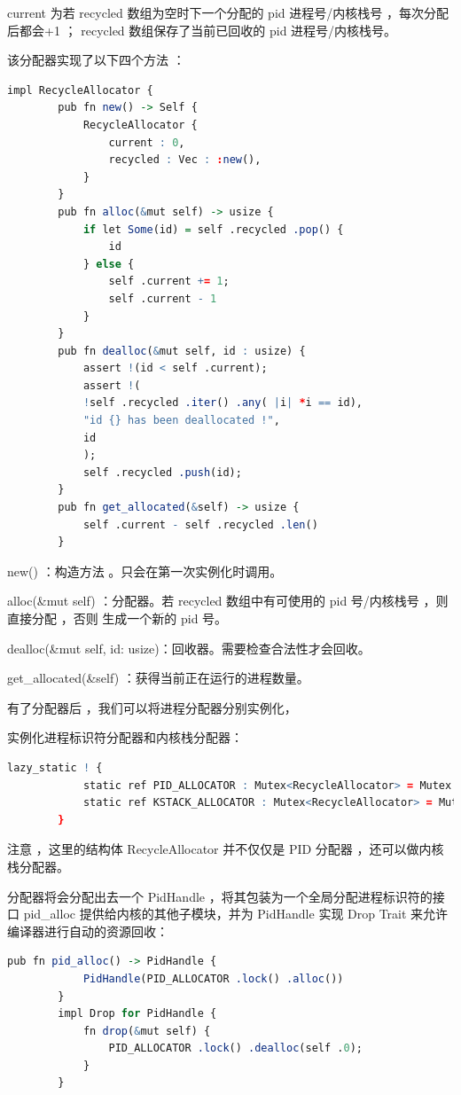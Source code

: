 current 为若 recycled 数组为空时下⼀个分配的 pid 进程号/内核栈号 ，每次分配后都会+1 ； recycled 数组保存了当前已回收的 pid 进程号/内核栈号。

该分配器实现了以下四个方法 ：

\begin{lstlisting}[language=R]
	impl RecycleAllocator {
		pub fn new() -> Self {
			RecycleAllocator {
				current : 0,
				recycled : Vec : :new(),
			}
		}
		pub fn alloc(&mut self) -> usize {
			if let Some(id) = self .recycled .pop() {
				id
			} else {
				self .current += 1;
				self .current - 1
			}
		}
		pub fn dealloc(&mut self, id : usize) {
			assert !(id < self .current);
			assert !(
			!self .recycled .iter() .any( |i| *i == id),
			"id {} has been deallocated !",
			id
			);
			self .recycled .push(id);
		}
		pub fn get_allocated(&self) -> usize {
			self .current - self .recycled .len()
		}
	\end{lstlisting}
	
	new() ：构造方法 。只会在第⼀次实例化时调用。
	
	alloc(\&mut self) ：分配器。若 recycled 数组中有可使用的 pid 号/内核栈号 ，则直接分配 ，否则 生成⼀个新的 pid 号。
	
	dealloc(\&mut self, id: usize)：回收器。需要检查合法性才会回收。
	
	get\_allocated(\&self) ：获得当前正在运行的进程数量。
	
	有了分配器后 ，我们可以将进程分配器分别实例化，
	
	实例化进程标识符分配器和内核栈分配器：
	\begin{lstlisting}[language=R]
		lazy_static ! {
			static ref PID_ALLOCATOR : Mutex<RecycleAllocator> = Mutex : :new(RecycleAllocator : :new()
			static ref KSTACK_ALLOCATOR : Mutex<RecycleAllocator> = Mutex : :new(RecycleAllocator : :new()
		}
	\end{lstlisting}
	
	注意 ，这里的结构体 RecycleAllocator 并不仅仅是 PID 分配器 ，还可以做内核栈分配器。 
	
	分配器将会分配出去一个 PidHandle ，将其包装为一个全局分配进程标识符的接口 pid_alloc 提供给内核的其他子模块，并为 PidHandle 实现 Drop Trait 来允许编译器进行自动的资源回收：
	
	\begin{lstlisting}[language=R]
		pub fn pid_alloc() -> PidHandle {
			PidHandle(PID_ALLOCATOR .lock() .alloc())
		}
		impl Drop for PidHandle {
			fn drop(&mut self) {
				PID_ALLOCATOR .lock() .dealloc(self .0);
			}
		}
	\end{lstlisting}
	
